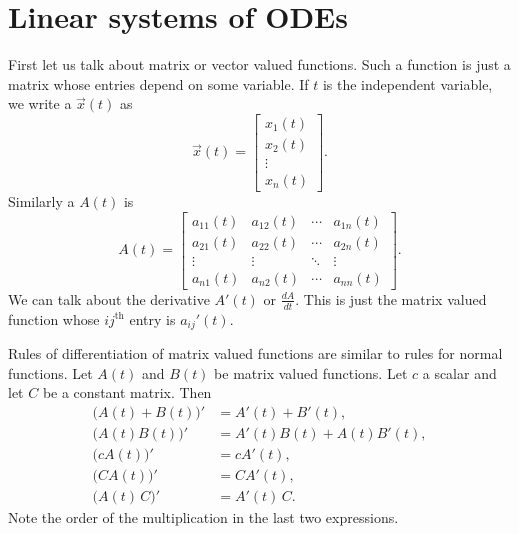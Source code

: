 \documentclass[12pt]{book}
\begin{document}
%


\sectionnewpage
\section{Linear systems of ODEs}


First let us talk about matrix or vector valued functions.  
Such a function is
just a matrix whose entries depend on some variable.
If $t$ is the independent variable, we write a
\emph{}
$\vec{x}(t)$ as
\begin{equation*}
\vec{x}(t) = \begin{bmatrix}
x_1(t) \\
x_2(t) \\
\vdots \\
x_n(t)
\end{bmatrix} .
\end{equation*}
Similarly a \emph{} $A(t)$ is
\begin{equation*}
A(t) =
\begin{bmatrix}
a_{11}(t) & a_{12}(t) & \cdots & a_{1n}(t) \\
a_{21}(t) & a_{22}(t) & \cdots & a_{2n}(t) \\
\vdots & \vdots & \ddots & \vdots \\
a_{n1}(t) & a_{n2}(t) & \cdots & a_{nn}(t)
\end{bmatrix} .
\end{equation*}
We can talk about the derivative $A'(t)$ or $\frac{dA}{dt}$.
This is just the matrix valued function
whose $ij^{\text{th}}$ entry is $a_{ij}'(t)$.

Rules of differentiation of matrix valued functions
are similar to rules for normal
functions.  Let $A(t)$ and $B(t)$ be matrix valued
functions.  Let $c$ a scalar and let $C$ be a constant matrix.
Then
\begin{align*}
\bigl(A(t)+B(t)\bigr)' & = A'(t) + B'(t), \\
\bigl(A(t)B(t)\bigr)' & = A'(t)B(t) + A(t)B'(t), \\
\bigl(cA(t)\bigr)' & = cA'(t), \\
\bigl(CA(t)\bigr)' & = CA'(t), \\
\bigl(A(t)\,C\bigr)' & = A'(t)\,C .
\end{align*}
Note the order of the multiplication in the last two expressions.
\end{document}
